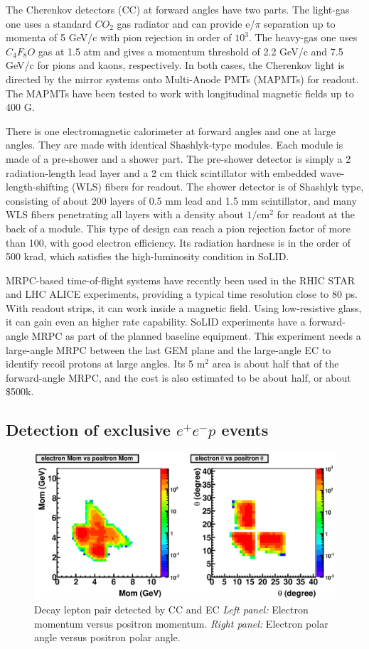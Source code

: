 The Cherenkov detectors (CC) at forward angles have two parts. The light-gas
one uses a standard $CO_2$ gas radiator and can provide e/$\pi$ separation up
to momenta of 5 GeV/c with pion rejection in order of $10^3$. The heavy-gas
one uses $C_4F_8O$ gas at 1.5 atm and gives a momentum threshold of 2.2 GeV/c
and 7.5 GeV/c for pions and kaons, respectively. In both cases, the Cherenkov
light is directed by the mirror systems onto Multi-Anode PMTs (MAPMTs) for
readout. The MAPMTs have been tested to work with longitudinal magnetic fields
up to 400 G.

There is one electromagnetic calorimeter at forward angles and one at large
angles. They are made with identical Shashlyk-type modules. Each module is
made of a pre-shower and a shower part. The pre-shower detector is simply a
2 radiation-length lead layer and a 2 cm thick scintillator with embedded
wave-length-shifting (WLS) fibers for readout. The shower detector is of
Shashlyk type, consisting of about 200 layers of 0.5 mm lead and 1.5 mm
scintillator, and many WLS fibers penetrating all layers with a density about
$1/$cm$^2$ for readout at the back of a module. This type of design can reach
a pion rejection factor of more than 100, with good electron efficiency. Its
radiation hardness is in the order of 500 krad, which satisfies the
high-luminosity condition in SoLID.

MRPC-based time-of-flight systems have recently been used in the RHIC STAR and
LHC ALICE experiments, providing a typical time resolution close to 80 ps.
With readout strips, it can work inside a magnetic field. Using low-resistive
glass, it can gain even an higher rate capability. SoLID experiments have a
forward-angle MRPC as part of the planned baseline equipment. This experiment
needs a large-angle MRPC between the last GEM plane and the large-angle EC to
identify recoil protons at large angles. Its 5 m$^2$ area is about half that
of the forward-angle MRPC, and the cost is also estimated to be about half,
or about \$500k.

\subsection{Detection of exclusive $e^+e^-p$ events}
\label{sec:tcs_selection}

\begin{figure}[t]
\includegraphics[width=125mm]{ep_final.eps}
\caption{\small{Decay lepton pair detected by CC and EC
{\it Left panel:} Electron momentum versus positron momentum.
{\it Right panel:} Electron polar angle versus positron polar angle.}}
\label{fig:eid}
\end{figure}

